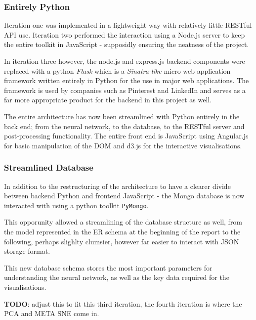 \documentclass[a4paper,11pt,titlepage]{article}
\begin{document}
	\subsubsection{Entirely Python}
	Iteration one was implemented in a lightweight way with relatively little RESTful API use. Iteration two performed the interaction using a Node.js server to keep the entire toolkit in JavaScript - supposidly ensuring the neatness of the project. 
	\par 
	In iteration three however, the node.js and express.js backend components were replaced with a python \textit{Flask} which is a \textit{Sinatra-like} micro web application framework written entirely in Python for the use in major web applications. The framework is used by companies such as Pinterest and LinkedIn and serves as a far more appropriate product for the backend in this project as well.
	\par 
	The entire architecture has now been streamlined with Python entirely in the back end; from the neural network, to the database, to the RESTful server and post-processing functionality. The entire front end is JavaScript using Angular.js for basic manipulation of the DOM and d3.js for the interactive visualisations.
	\par 
	
	\subsubsection{Streamlined Database}
	In addition to the restructuring of the architecture to have a clearer divide between backend Python and frontend JavaScript - the Mongo database is now interacted with using a python toolkit \texttt{PyMongo}. 
	\par 
	This opporunity allowed a streamlining of the database structure as well, from the model represented in the ER schema at the beginning of the report to the following, perhaps slighlty clumsier, however far easier to interact with JSON storage format.
	\par 
	This new database schema stores the most important parameters for understanding the neural network, as well as the key data required for the visualisations.
	
	\textbf{TODO}: adjust this to fit this third iteration, the fourth iteration is where the PCA and META SNE come in.
	
\end{document}
